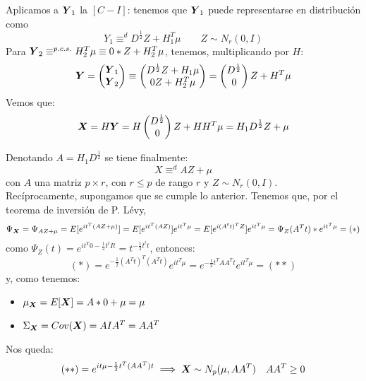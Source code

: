 Aplicamos a $\boldsymbol{Y}_1$ la $[C-I]$: tenemos que $\boldsymbol{Y}_1$ puede representarse en distribución como
\[
Y_1 \equiv^d D^{\frac{1}{2}}Z + H_1^T \mu \quad \quad  Z \sim N_r(0,I) 
\]
Para $\boldsymbol{Y}_2 \equiv^{p.c.s.} H_2^T \mu \equiv 0*Z + H_2^T \mu$, tenemos, multiplicando por $H$:
\[
\boldsymbol{Y} = \begin{pmatrix} \boldsymbol{Y}_1 \\ \boldsymbol{Y}_2 \end{pmatrix} \equiv \begin{pmatrix} D^{\frac{1}{2}} Z + H_1\mu \\ 0Z+ H_2^T \mu\end{pmatrix} = \begin{pmatrix} D^{\frac{1}{2}} \\ 0 \end{pmatrix}Z + H^T \mu
\]
Vemos que:
\[
\boldsymbol{X} = H\boldsymbol{Y} = H\begin{pmatrix} D^{\frac{1}{2}} \\ 0\end{pmatrix} Z + HH^T\mu = H_1D^{\frac{1}{2}}Z + \mu
\]

Denotando $A= H_1D^{\frac{1}{2}}$ se tiene finalmente:
\[
X \equiv^{d} AZ + \mu
\]
con $A$ una matriz $p\times r$, con $r\leq p$ de rango $r$ y $Z\sim N_r(0,I)$.\\

Recíprocamente, supongamos que se cumple lo anterior. Tenemos que, por el teorema de inversión de P. Lévy,
\[
\Psi_{\boldsymbol{X}} = \Psi_{AZ + \mu}  = E[e^{it^T(AZ +  \mu)}] = E[e^{it^T(AZ)}]e^{it^T\mu} = E[e^{i(A^t t)^T Z}]e^{it^T \mu} = \Psi_Z(A^Tt)*e^{it^T \mu} = (*)
\]
como $\Psi_Z(t) = e^{it^T 0 - \frac{1}{2}t^tIt} = t^{-\frac{1}{2}t^t t}$, entonces:
\[
(*) = e^{-\frac{1}{2}(A^T t)^T(A^T t)} e^{it^T \mu} = e^{-\frac{1}{2}t^T A A^T t} e^{it^T \mu} = (**)
\]
y, como tenemos:
\begin{itemize}
  \item $\mu_{\boldsymbol{X}} = E[\boldsymbol{X}]=A*0 +\mu = \mu$
  \item $\Sigma_{\boldsymbol{X}} = Cov(\boldsymbol{X}) = AIA^T = AA^T$
\end{itemize}
Nos queda:
\[
(**) = e^{it\mu - \frac{1}{2}t^T(AA^T)t} \implies \boldsymbol{X} \sim N_p(\mu, AA^T) \quad AA^T \geq 0
\]

